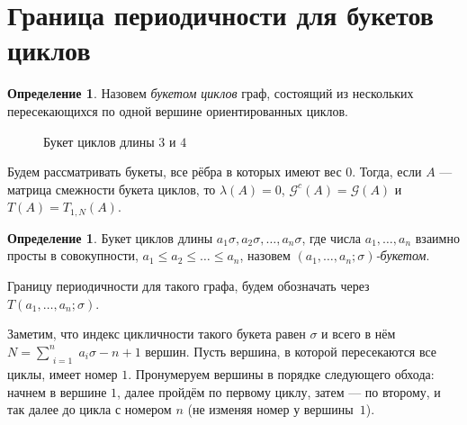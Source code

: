 \documentclass[12pt]{article}
\theoremstyle{definition}
\newtheorem{definition}[theorem]{Определение}
\begin{document}
\section{Граница периодичности для букетов циклов}
\label{wedge}
\begin{definition} Назовем \textit{букетом циклов} граф, состоящий из нескольких пересекающихся по одной вершине ориентированных циклов.
\end{definition}

\begin{figure}[H]
\centering
{}
\caption{Букет циклов длины $3$ и $4$}
\end{figure}

Будем рассматривать букеты, все рёбра в которых имеют вес $0$. Тогда, если $A$ --- матрица смежности букета циклов, то $\lambda(A) = 0$, $\mathcal{G}^c(A) = \mathcal{G}(A)$ и $T(A) = T_{1, N}(A)$.

\begin{definition}
Букет циклов длины $a_1\sigma, a_2\sigma, \dots, a_n\sigma$, где числа $a_1, \dots, a_n$ взаимно просты в совокупности, $a_1\le a_2 \le \dots \le a_n$, назовем \textit{$(a_1, \dots, a_n; \sigma)$-букетом}.

Границу периодичности для такого графа, будем обозначать через $T(a_1, \dots, a_n; \sigma)$.
\end{definition}

Заметим, что индекс цикличности такого букета равен $\sigma$ и всего в нём $N = \sum\limits_{\substack{i=1}}^n a_i\sigma - n + 1$ вершин. Пусть вершина, в которой пересекаются все циклы, имеет номер $1$. Пронумеруем вершины в порядке следующего обхода: начнем в вершине $1$, далее пройдём по первому циклу, затем --- по второму, и так далее до цикла с номером $n$ (не изменяя номер у вершины~$1$).
\end{document}
